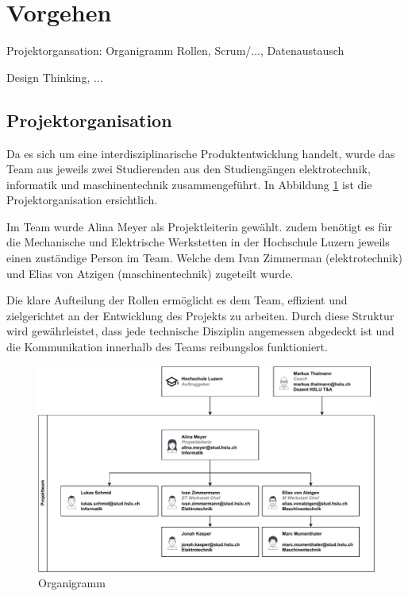 \section{Vorgehen}

Projektorgansation: Organigramm Rollen, Scrum/..., Datenaustausch

Design Thinking, ...

\subsection{Projektorganisation}

Da es sich um eine interdisziplinarische Produktentwicklung handelt, wurde das Team aus jeweils zwei Studierenden aus den Studiengängen \acrfull{elektrotechnik}, \acrfull{informatik} und \acrfull{maschinentechnik} zusammengeführt. In Abbildung \ref{fig:Organigramm} ist die Projektorganisation ersichtlich. 

Im Team wurde Alina Meyer als Projektleiterin gewählt. zudem benötigt es für die Mechanische und Elektrische Werkstetten in der Hochschule Luzern jeweils einen zuständige Person im Team. Welche dem Ivan Zimmerman (\acrshort{elektrotechnik}) und Elias von Atzigen (\acrshort{maschinentechnik}) zugeteilt wurde.

Die klare Aufteilung der Rollen ermöglicht es dem Team, effizient und zielgerichtet an der Entwicklung des Projekts zu arbeiten. Durch diese Struktur wird gewährleistet, dass jede technische Disziplin angemessen abgedeckt ist und die Kommunikation innerhalb des Teams reibungslos funktioniert.

\begin{figure}[h]
\centering
\includegraphics[width=\textwidth]{img/Projektorganisation.pdf}
\caption{Organigramm}
\label{fig:Organigramm}
\end{figure}